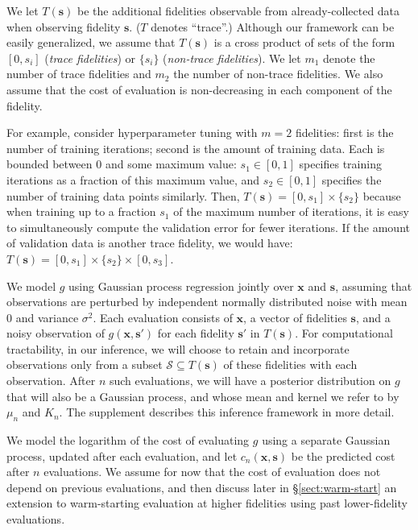 \documentclass[letterpaper]{article}
\let\Section\S
\newcommand{\cost}{c}
\newcommand{\x}{\mathbf{x}}
\newcommand{\s}{\mathbf{s}}
\newcommand{\T}{T}
\renewcommand{\S}{S}
\numberwithin{equation}{section}
\newcommand{\sectn}[1]{\Section\ref{#1}}
\begin{document}
We let $\T(\s)$ be the additional fidelities observable from already-collected data when observing fidelity $\s$.  ($\T$ denotes ``trace''.)  Although our framework can be easily generalized, we assume that $\T(\s)$ is a cross product of sets of the form $[0,s_i]$ (\emph{trace fidelities}) or $\{s_i\}$ (\emph{non-trace fidelities}). 
We let $m_1$ denote the number of trace fidelities and $m_2$ the number of non-trace fidelities.
We also assume that the cost of evaluation is non-decreasing in each component of the fidelity.

For example, consider hyperparameter tuning with $m=2$ fidelities: first is the number of training iterations; %
second is the amount of training data.  %
Each is bounded between $0$ and some maximum value: $s_1 \in [0,1]$ specifies training iterations as a fraction of this maximum value, and $s_2 \in [0,1]$ specifies the number of training data points similarly.
Then, $\T(\s) = [0,s_1] \times \{s_2\}$ because 
when training up to a fraction $s_1$ of the maximum number of iterations, it is
easy to simultaneously compute the validation error for fewer iterations.
If the amount of validation data is another trace fidelity, we would have: $\T(\s) = [0,s_1] \times \{s_2\} \times [0,s_3]$. 

We model $g$ using Gaussian process regression jointly over $\x$ and $\s$, assuming that observations are perturbed by independent normally distributed noise with mean $0$ and variance $\sigma^2$.  Each evaluation consists of $\x$, a vector of fidelities $\s$, and a noisy observation of $g(\x,\s')$ for each fidelity $\s'$ in $\T(\s)$.  For computational tractability, in our inference, we will choose to retain and incorporate observations only from a subset $\mathcal{S} \subseteq \T(\s)$ of these fidelities with each observation.  After $n$ such evaluations, we will have a posterior distribution on $g$ that will also be a Gaussian process, and whose mean and kernel we refer to by $\mu_n$ and $K_n$.  The supplement describes this inference framework in more detail.

We model the logarithm of the cost of evaluating $g$ using a separate Gaussian process, updated after each evaluation,
and let $\cost_n(\x,\s)$ be the predicted cost after $n$ evaluations.
We assume for now that the cost of evaluation does not depend on previous evaluations, and then discuss later in \sectn{sect:warm-start} an extension to warm-starting evaluation at higher fidelities using past lower-fidelity evaluations.
\end{document}
